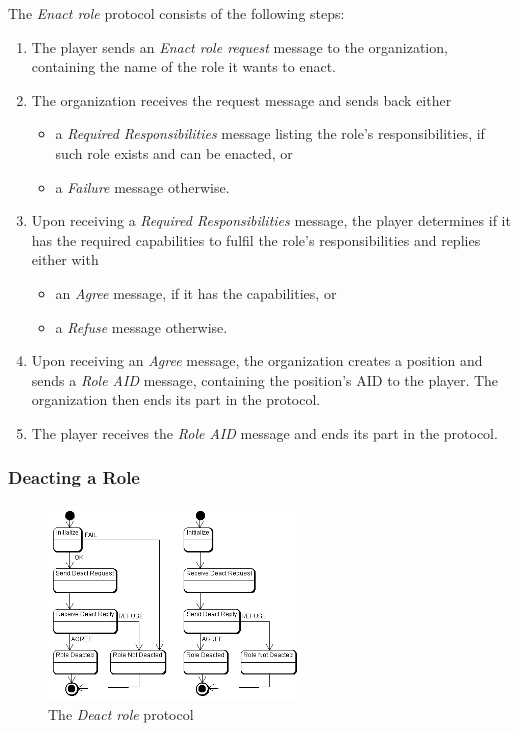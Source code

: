 The \textit{Enact role} protocol consists of the following steps:
\begin{enumerate}
	\item The player sends an \textit{Enact role request} message to the organization, containing the name of the role it wants to enact.
	\item The organization receives the request message and sends back either
	\begin{itemize}
		\item a \textit{Required Responsibilities} message listing the role's responsibilities, if such role exists and can be enacted, or
		\item a \textit{Failure} message otherwise.
	\end{itemize}
	\item Upon receiving a \textit{Required Responsibilities} message, the player determines if it has the required capabilities to fulfil the role's responsibilities and replies either with
	\begin{itemize}
		\item an \textit{Agree} message, if it has the capabilities, or
		\item a \textit{Refuse} message otherwise.
	\end{itemize}
	\item Upon receiving an \textit{Agree} message, the organization creates a position and sends a \textit{Role AID} message, containing the position's AID to the player.
	The organization then ends its part in the protocol.
	\item The player receives the \textit{Role AID} message and ends its part in the protocol.
\end{enumerate}


\subsubsection{Deacting a Role}

\begin{figure}[ht]
	\centering
	\includegraphics[width=0.6\textwidth]{images/thespian/deact-role-protocol}
	\caption{The \textit{Deact role} protocol}
	\label{figure:thespian-deact-role-protocol}
\end{figure}

